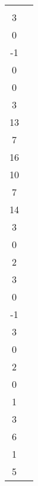 \begin{activity}{15}
\begin{center}
\begin{tabular}{cc}
      \(C=\left\{
      \begin{bmatrix}2\\3\\0\\-1\end{bmatrix},
      \begin{bmatrix}2\\0\\0\\3\end{bmatrix},
      \begin{bmatrix}3\\13\\7\\16\end{bmatrix},
      \begin{bmatrix}-1\\10\\7\\14\end{bmatrix},
      \begin{bmatrix}4\\3\\0\\2\end{bmatrix}
      \right\}
      \) &

  	\(D=\left\{
      \begin{bmatrix}2\\3\\0\\-1\end{bmatrix},
      \begin{bmatrix}4\\3\\0\\2\end{bmatrix},
      \begin{bmatrix}-3\\0\\1\\3\end{bmatrix},
      \begin{bmatrix}3\\6\\1\\5\end{bmatrix}
      \right\}
      \) \\


\end{tabular}
\end{center}
\end{activity}
